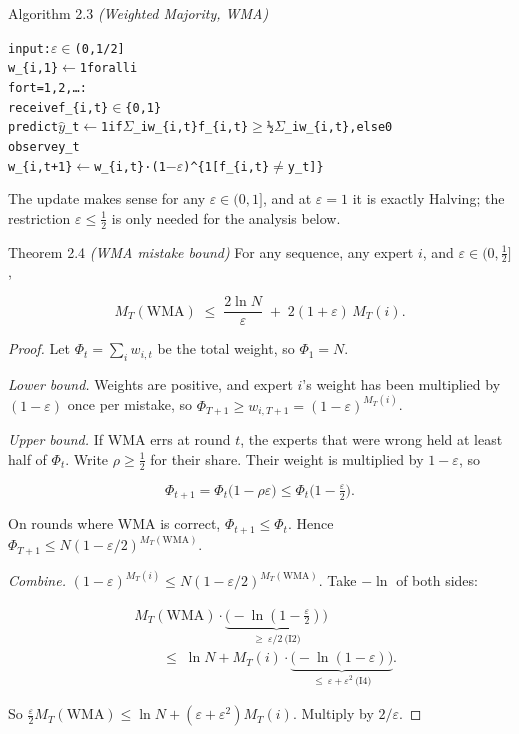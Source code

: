 \documentclass[11pt,a4paper,openany]{book}
\newcommand{\eps}{\varepsilon}
\newenvironment{algo}{\par\smallskip\begingroup\footnotesize\begin{alltt}}{\end{alltt}\endgroup\smallskip}
\begin{document}
\begin{balg}{Algorithm 2.3 \emph{(Weighted Majority, WMA)}}
\begin{algo}
input: \ensuremath{\varepsilon} \ensuremath{\in} (0, 1/2]
w\_\{i,1\} \ensuremath{\leftarrow} 1 for all i
for t = 1, 2, …:
    receive f\_\{i,t\} \ensuremath{\in} \{0,1\}
    predict \ensuremath{\hat{y}}\_t \ensuremath{\leftarrow} 1  if  \ensuremath{\Sigma}\_i w\_\{i,t\} f\_\{i,t\} \ensuremath{\ge} ½ \ensuremath{\Sigma}\_i w\_\{i,t\},  else 0
    observe y\_t
    w\_\{i,t+1\} \ensuremath{\leftarrow} w\_\{i,t\} · (1\ensuremath{-}\ensuremath{\varepsilon})\textasciicircum{}\{ 1[f\_\{i,t\} \ensuremath{\neq} y\_t] \}
\end{algo}

The update makes sense for any $\eps\in(0,1]$, and at $\eps=1$ it is exactly Halving; the restriction $\eps\le\tfrac12$ is only needed for the analysis below.
\end{balg}

\begin{bthm}{Theorem 2.4 \emph{(WMA mistake bound)}}
For any sequence, any expert $i$, and $\eps\in(0,\tfrac12]$,

\[M_T(\mathrm{WMA})\;\le\;\frac{2\ln N}{\eps}\;+\;2(1+\eps)\,M_T(i).\]

\end{bthm}

\begin{proof}
Let $\Phi_t=\sum_i w_{i,t}$ be the total weight, so $\Phi_1=N$.

\emph{Lower bound.} Weights are positive, and expert $i$'s weight has been multiplied by $(1-\eps)$ once per mistake, so $\Phi_{T+1}\ge w_{i,T+1}=(1-\eps)^{M_T(i)}$.

\emph{Upper bound.} If WMA errs at round $t$, the experts that were wrong held at least half of $\Phi_t$. Write $\rho\ge\tfrac12$ for their share. Their weight is multiplied by $1-\eps$, so

\[\Phi_{t+1}=\Phi_t\big(1-\rho\eps\big)\le\Phi_t\big(1-\tfrac\eps2\big).\]

On rounds where WMA is correct, $\Phi_{t+1}\le\Phi_t$. Hence $\Phi_{T+1}\le N(1-\eps/2)^{M_T(\mathrm{WMA})}$.

\emph{Combine.} $(1-\eps)^{M_T(i)}\le N(1-\eps/2)^{M_T(\mathrm{WMA})}$. Take $-\ln$ of both sides:

\[\begin{aligned}&M_T(\mathrm{WMA})\cdot\underbrace{\big(-\ln(1-\tfrac\eps2)\big)}_{\ge\ \eps/2\ \text{(I2)}}\\
&\qquad\le\;\ln N+M_T(i)\cdot\underbrace{\big(-\ln(1-\eps)\big)}_{\le\ \eps+\eps^2\ \text{(I4)}}.\end{aligned}\]

So $\tfrac\eps2 M_T(\mathrm{WMA})\le\ln N+(\eps+\eps^2)M_T(i)$. Multiply by $2/\eps$.
\end{proof}
\end{document}
